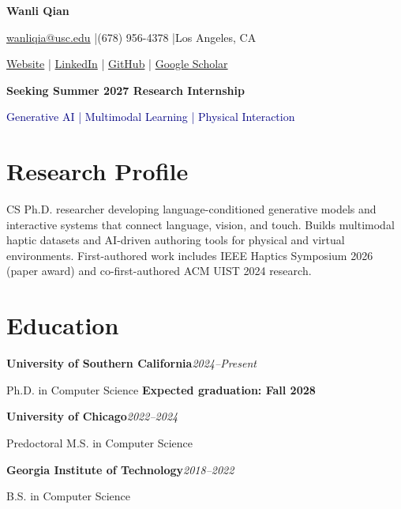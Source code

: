\documentclass[11pt,letterpaper]{article}
\newcommand{\role}[2]{\textbf{#1}\hfill\textit{#2}\par}
\begin{document}
\fontsize{10.5}{12.4}\selectfont
{\fontsize{24}{27}\selectfont\textbf{Wanli Qian}}\par
\vspace{3pt}
\href{mailto:wanliqia@usc.edu}{wanliqia@usc.edu} \enspace|\enspace (678) 956-4378 \enspace|\enspace Los Angeles, CA\par
\href{https://silverwings-zero.github.io/}{Website} \enspace|\enspace
\href{https://www.linkedin.com/in/wanli-qian-7bb399192/}{LinkedIn} \enspace|\enspace
\href{https://github.com/silverwings-zero}{GitHub} \enspace|\enspace
\href{https://scholar.google.com/citations?user=azFoAIkAAAAJ&hl=en}{Google Scholar}\par
\vspace{4pt}
\textbf{Seeking Summer 2027 Research Internship}\par
\textcolor{navy}{Generative AI | Multimodal Learning | Physical Interaction}\par
\section*{Research Profile}
CS Ph.D. researcher developing language-conditioned generative models and interactive systems that connect language, vision, and touch. Builds multimodal haptic datasets and AI-driven authoring tools for physical and virtual environments. First-authored work includes IEEE Haptics Symposium 2026 (paper award) and co-first-authored ACM UIST 2024 research.\par

\section*{Education}
\role{University of Southern California}{2024--Present}
Ph.D. in Computer Science \hfill \textbf{Expected graduation: Fall 2028}\par
\vspace{3pt}
\role{University of Chicago}{2022--2024}
Predoctoral M.S. in Computer Science\par
\vspace{3pt}
\role{Georgia Institute of Technology}{2018--2022}
B.S. in Computer Science\par
\end{document}
